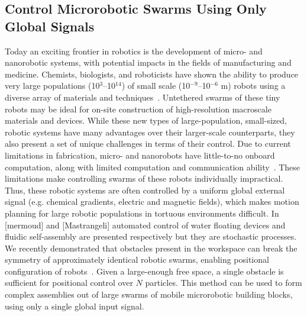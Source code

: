 \subsection{Control Microrobotic Swarms Using Only Global Signals}
Today an exciting frontier in robotics is the development of micro- and nanorobotic systems, with potential impacts in the fields of manufacturing and medicine. 
Chemists, biologists, and roboticists have shown the ability to produce very large populations (10$^3$--10$^{14}$) of small scale (10$^{-9}$--10$^{-6}$ m) robots using a diverse array of materials and techniques~\cite{rubenstein2012kilobot,ou2013motion,chiang2011toward}. 
Untethered swarms of these tiny robots may be ideal for on-site construction of high-resolution macroscale materials and devices. 
While these new types of large-population, small-sized, robotic systems have many advantages over their larger-scale counterparts, they also present a set of unique challenges in terms of their control. 
Due to  current limitations in fabrication, micro- and nanorobots have little-to-no onboard computation, along with limited computation and communication ability~\cite{chiang2011toward, chowdhury2015controlling, donald2013planning}.  
These limitations make controlling swarms of these robots individually impractical. 
Thus, these robotic systems are often controlled by a uniform global external signal (e.g. chemical gradients, electric and magnetic fields), which makes motion planning for large robotic populations in tortuous environments difficult. 
In [mermoud] and [Mastrangeli] automated control of water floating devices and fluidic self-assembly are presented respectively but they are stochastic processes. 
We recently demonstrated that obstacles present in the workspace can break the symmetry of approximately identical robotic swarms, enabling positional configuration of robots~\cite{becker2013massive}. 
 Given a large-enough free space, a single obstacle is sufficient for positional control over $N$ particles.  
This method can be used to form complex assemblies out of large swarms of mobile microrobotic building blocks, using only a single global input signal.


